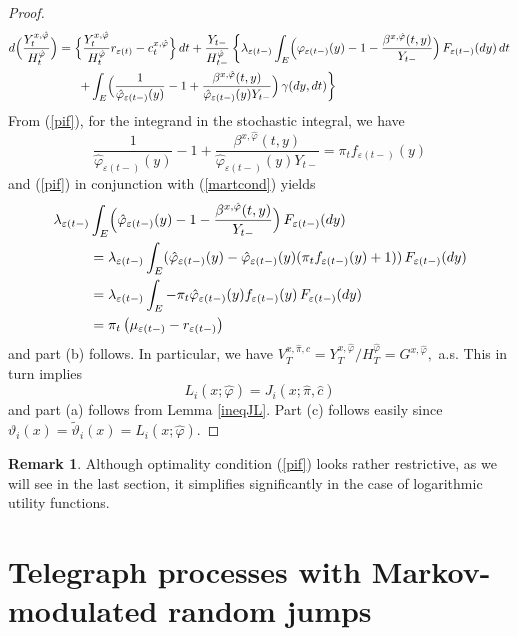 \documentclass[11pt]{article}
\theoremstyle{plain}
\theoremstyle{definition}
\newtheorem{remark}[theorem]{Remark}
\numberwithin{equation}{section}
\newcommand{\eps}{\varepsilon}
\begin{document}
\begin{proof}
\begin{align*}
d\Bigl(\frac{Y^{x,\hat{\varphi}}_t}{H^{\hat{\varphi}}_t}\Bigr)
  &=\Bigl\{\frac{Y^{x,\hat{\varphi}}_t}{H^{\hat{\varphi}}_t}r_{\eps(t)}-c^{x,\hat{\varphi}}_t\Bigr\}\,dt
+\frac{Y_{t-}}{H^{\hat{\varphi}}_{t-}}\left\{\lambda_{\eps(t-)}\int_E\Bigl(\varphi_{\eps(t-)}(y)-1-\frac{\beta^{x,\hat{\varphi}}(t,y)}{Y_{t-}}\Bigr)\,F_{\eps(t-)}(dy)\,dt\right.\\
&\phantom{==}\left.+\int_E\Bigl(\frac{1}{\hat{\varphi}_{\eps(t-)}(y)}-1+\frac{\beta^{x,\hat{\varphi}}(t,y)}{\hat{\varphi}_{\eps(t-)}(y)Y_{t-}}\Bigr)\,\gamma(dy,dt)\right\}
\end{align*}
From (\ref{pif}), for the integrand in the stochastic integral, we have
\[
\frac{1}{\hat{\varphi}_{\eps(t-)}(y)}-1+\frac{\beta^{x,\hat{\varphi}}(t,y)}{\hat{\varphi}_{\eps(t-)}(y)Y_{t-}}
  =\pi_tf_{\eps(t-)}(y)
\]
and (\ref{pif}) in conjunction with (\ref{martcond}) yields
\begin{align*}
\lambda_{\eps(t-)}&\int_E\Bigl(\hat{\varphi}_{\eps(t-)}(y)-1-\frac{\beta^{x,\hat{\varphi}}(t,y)}{Y_{t-}}\Bigr)\,F_{\eps(t-)}(dy)\\
&=\lambda_{\eps(t-)}\int_E(\hat{\varphi}_{\eps(t-)}(y)-\hat{\varphi}_{\eps(t-)}(y)(\pi_tf_{\eps(t-)}(y)+1))\,F_{\eps(t-)}(dy)\\
&=\lambda_{\eps(t-)}\int_E-\pi_t\hat{\varphi}_{\eps(t-)}(y)f_{\eps(t-)}(y)\,F_{\eps(t-)}(dy)\\
&=\pi_t\left(\mu_{\eps(t-)}-r_{\eps(t-)}\right)
\end{align*}
and part (b) follows. In particular, we have $V_T^{x,\hat{\pi},\hat{c}}=Y_T^{x,\hat{\varphi}}/H_T^{\hat{\varphi}}=G^{x,\hat{\varphi}},$ a.s. This in turn implies
\begin{equation}
L_i(x;\hat{\varphi})=J_i(x;\hat{\pi},\hat{c})
\end{equation}
and part (a) follows from Lemma \ref{ineqJL}. Part (c) follows easily since $\vartheta_i(x)=\tilde{\vartheta}_i(x)=L_i(x;\hat{\varphi}).$
\end{proof}
\begin{remark}
Although optimality condition (\ref{pif}) looks rather restrictive,  as we will see in the last section, it simplifies significantly in the case of logarithmic utility functions.
\end{remark}
\section{Telegraph processes with Markov-modulated random jumps}
\end{document}
